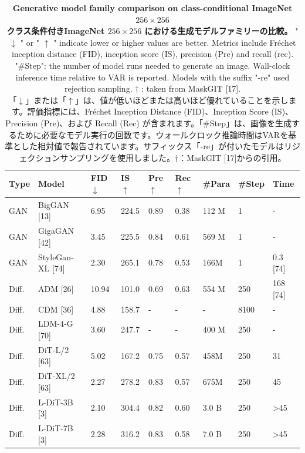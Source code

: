 \documentclass{article}
\begin{document}
\begin{table}[h]
\begin{center}
\captionsetup{labelformat=empty}
\caption{
\textbf{Generative model family comparison on class-conditional ImageNet $256\times256$
\\
クラス条件付きImageNet $256 \times 256$ における生成モデルファミリーの比較。
}
" $\downarrow$ " or " $\uparrow$ " indicate lower or higher values are better. Metrics include Fréchet inception distance (FID), inception score (IS), precision (Pre) and recall (rec). "\#Step": the number of model runs needed to generate an image. Wall-clock inference time relative to VAR is reported. Models with the suffix "-re" used rejection sampling. $\dagger$ : taken from MaskGIT [17].
\\
「$\downarrow$」または「$\uparrow$」は、値が低いほどまたは高いほど優れていることを示します。評価指標には、Fréchet Inception Distance (FID)、Inception Score (IS)、Precision (Pre)、および Recall (Rec) が含まれます。「\#Step」は、画像を生成するために必要なモデル実行の回数です。ウォールクロック推論時間はVARを基準とした相対値で報告されています。サフィックス「-re」が付いたモデルはリジェクションサンプリングを使用しました。$\dagger$：MaskGIT [17]からの引用。
}
\begin{tabular}{|l|l|l|l|l|l|l|l|l|}
\hline
Type & Model & FID $\downarrow$ & IS $\uparrow$ & Pre $\uparrow$ & Rec $\uparrow$ & \#Para & \#Step & Time \\
\hline
GAN & BigGAN [13] & 6.95 & 224.5 & 0.89 & 0.38 & 112 M & 1 & - \\
\hline
GAN & GigaGAN [42] & 3.45 & 225.5 & 0.84 & 0.61 & 569 M & 1 & - \\
\hline
GAN & StyleGan-XL [74] & 2.30 & 265.1 & 0.78 & 0.53 & 166M & 1 & 0.3 [74] \\
\hline
Diff. & ADM [26] & 10.94 & 101.0 & 0.69 & 0.63 & 554 M & 250 & 168 [74] \\
\hline
Diff. & CDM [36] & 4.88 & 158.7 & - & - & - & 8100 & - \\
\hline
Diff. & LDM-4-G [70] & 3.60 & 247.7 & - & - & 400 M & 250 & - \\
\hline
Diff. & DiT-L/2 [63] & 5.02 & 167.2 & 0.75 & 0.57 & 458M & 250 & 31 \\
\hline
Diff. & DiT-XL/2 [63] & 2.27 & 278.2 & 0.83 & 0.57 & 675M & 250 & 45 \\
\hline
Diff. & L-DiT-3B [3] & 2.10 & 304.4 & 0.82 & 0.60 & 3.0 B & 250 & >45 \\
\hline
Diff. & L-DiT-7B [3] & 2.28 & 316.2 & 0.83 & 0.58 & 7.0 B & 250 & >45 \\

\end{tabular}
\end{center}
\end{table}
\end{document}

